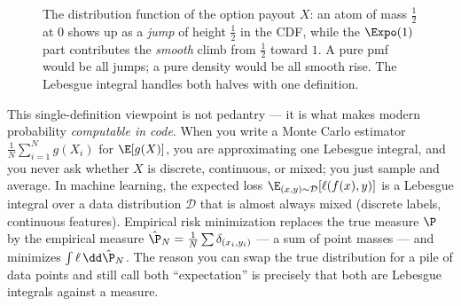 \begin{figure}[H]
\centering
{}
\caption{The distribution function of the option payout $X$: an atom of mass
$\tfrac12$ at $0$ shows up as a \emph{jump} of height $\tfrac12$ in the CDF,
while the $\Expo(1)$ part contributes the \emph{smooth} climb from $\tfrac12$
toward $1$. A pure pmf would be all jumps; a pure density would be all smooth
rise. The Lebesgue integral handles both halves with one definition.}
\label{ch37:fig-mixed-cdf}
\end{figure}

\begin{applicationbox}
This single-definition viewpoint is not pedantry --- it is what makes modern
probability \emph{computable in code}. When you write a Monte Carlo estimator
$\frac1N\sum_{i=1}^N g(X_i)$ for $\E[g(X)]$, you are approximating one Lebesgue
integral, and you never ask whether $X$ is discrete, continuous, or mixed; you
just sample and average. In machine learning, the expected loss
$\E_{(x,y)\sim\mathcal D}[\ell(f(x),y)]$ is a Lebesgue integral over a data
distribution $\mathcal D$ that is almost always mixed (discrete labels,
continuous features). Empirical risk minimization replaces the true measure $\P$
by the empirical measure $\hat\P_N=\frac1N\sum\delta_{(x_i,y_i)}$ --- a sum of
point masses --- and minimizes $\int \ell\,\dd\hat\P_N$. The reason you can swap
the true distribution for a pile of data points and still call both
``expectation'' is precisely that both are Lebesgue integrals against a measure.
\end{applicationbox}


